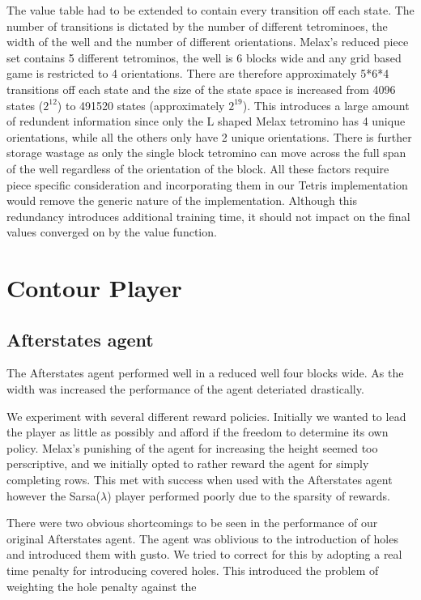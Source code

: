 \documentclass{rucsthesis}
\begin{document}
The value table had to be extended to contain every transition off each state. The number of transitions is dictated by the number of different tetrominoes, the width of the well and the number of different orientations. Melax's reduced piece set contains 5 different tetrominos, the well is 6 blocks wide and any grid based game is restricted to 4 orientations. There are therefore approximately 5*6*4 transitions off each state and the size of the state space is increased from 4096 states ($2^{12}$) to 491520 states (approximately $2^{19}$). This introduces a large amount of redundent information since only the L shaped Melax tetromino has 4 unique orientations, while all the others only have 2 unique orientations. There is further storage wastage as only the single block tetromino can move across the full span of the well regardless of the orientation of the block. All these factors require piece specific consideration and incorporating them in our Tetris implementation would remove the generic nature of the implementation. Although this redundancy introduces additional training time, it should not impact on the final values converged on by the value function.

\chapter{Contour Player}

\section{Afterstates agent}

The Afterstates agent performed well in a reduced well four blocks wide. As the width was increased the performance of the agent deteriated drastically. 

We experiment with several different reward policies. Initially we wanted to lead the player as little as possibly and afford if the freedom to determine its own policy. Melax's punishing of the agent for increasing the height seemed too perscriptive, and we initially opted to rather reward the agent for simply completing rows. This met with success when used with the Afterstates agent however the Sarsa($\lambda$) player performed poorly due to the sparsity of rewards.

There were two obvious shortcomings to be seen in the performance of our original Afterstates agent. The agent was oblivious to the introduction of holes and introduced them with gusto. We tried to correct for this by adopting a real time penalty for introducing covered holes. This introduced the problem of weighting the hole penalty against the  
\end{document}
